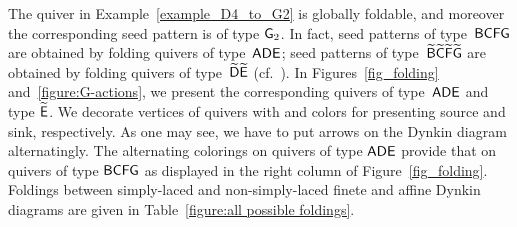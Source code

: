 \begin{example}\label{example_folding_ADE}
The quiver in Example~\ref{example_D4_to_G2} is globally foldable, and
moreover the corresponding seed pattern is of type $\mathsf{G}_2$. In fact, 
seed patterns of type~$\mathsf{BCFG}$  are obtained by 
folding quivers of type~$\mathsf{ADE}$; seed 
patterns of type~$\widetilde{\mathsf{B}}\widetilde{\mathsf{C}}\widetilde{\mathsf{F}}\widetilde{\mathsf{G}}$ are obtained by folding quivers 
of type~$\widetilde{\mathsf{D}}\widetilde{\mathsf{E}}$ 
(cf.~\cite{FeliksonShapiroTumarkin12_unfoldings}).
In Figures~\ref{fig_folding} and~\ref{figure:G-actions}, we present the corresponding quivers of
type~$\mathsf{ADE}$ and type $\widetilde{\mathsf{E}}$. We decorate vertices of quivers with \colorbox{cyclecolor2!50!}{\cyclecolornamesecond} and \colorbox{cyclecolor1!50!}{\cyclecolornamefirst} colors for presenting source and sink, respectively. 
As one may see, we have to put arrows on the Dynkin diagram alternatingly.
The alternating colorings on quivers of type $\mathsf{ADE}$ provide 
that on quivers of type $\mathsf{BCFG}$ as displayed in the right column of Figure~\ref{fig_folding}.
Foldings between simply-laced and non-simply-laced finete and affine Dynkin diagrams are given in 
Table~\ref{figure:all possible foldings}.
\end{example}
